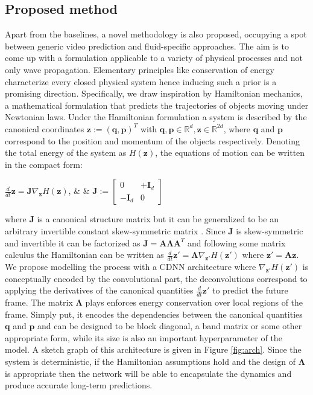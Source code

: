 \documentclass[a4paper,11pt]{article}
\begin{document}
\subsection{Proposed method}
\label{sec:3proposed}
Apart from the baselines, a novel methodology is also proposed, occupying a spot between generic video prediction and fluid-specific approaches. The aim is to come up with a formulation applicable to a variety of physical processes and not only wave propagation. Elementary principles like conservation of energy characterize every closed physical system hence inducing such a prior is a promising direction. Specifically, we draw inspiration by Hamiltonian mechanics, a mathematical formulation that predicts the trajectories of objects moving under Newtonian laws. Under the Hamiltonian formulation a system is described by the canonical coordinates $\mathbf{z} :=(\mathbf{q}, \mathbf{p})^{T}$ with $  \mathbf{q}, \mathbf{p} \in \mathbb{R}^{d}, \mathbf{z} \in \mathbb{R}^{2 d}$, where $\mathbf{q}$ and $\mathbf{p}$ correspond to the position and momentum of the objects respectively. Denoting the total energy of the system as $H(\mathbf{z})$, the equations of motion can be written in the compact form:

\begin{center}

\begin{tabularx}{\textwidth}
\vskip -7pt
$\frac{d}{d t} \mathbf{z}= \mathbf{J} \nabla_{\mathbf{z}} H(\mathbf{z})$,
    &  & 
$\mathbf{J} :=\left[ \begin{array}{cc}{0} & {+\mathbf{I}_{d}} \\ {-\mathbf{I}_{d}} & {0}\end{array}\right]$
\end{tabularx}
\end{center}
\vskip -4pt

where $\mathbf{J}$ is a canonical structure matrix but it can be generalized to be an arbitrary invertible constant skew-symmetric matrix \cite{leimkuhler_reich_2005hamiltonian}. Since $\mathbf{J}$ is skew-symmetric and invertible it can be factorized as $\mathbf{J} = \mathbf{A\Lambda A}^T$ and following some matrix calculus the Hamiltonian can be written as $\frac{d}{d t} \mathbf{z'}= \mathbf{\Lambda} \nabla_{\mathbf{z'}} H(\mathbf{z'})$ where $\mathbf{z'} = \mathbf{Az}$. We propose modelling the process with a CDNN architecture where $\nabla_{\mathbf{z'}} H(\mathbf{z'})$ is conceptually encoded by the convolutional part,  the deconvolutions correspond to applying the derivatives of the canonical quantities $\frac{d}{d t} \mathbf{z'}$ to predict the future frame. The matrix $\mathbf{\Lambda}$ plays enforces energy conservation over local regions of the frame. Simply put, it encodes the dependencies between the canonical quantities $\mathbf{q}$ and $\mathbf{p}$ and can be designed to be block diagonal, a band matrix or some other appropriate form, while its size is also an important hyperparameter of the model. A sketch graph of this architecture is given in Figure \ref{fig:arch}. Since the system is deterministic, if the Hamiltonian assumptions hold and the design of  $\mathbf{\Lambda}$ is appropriate then the network will be able to encapsulate the dynamics and produce accurate long-term predictions.
\end{document}
